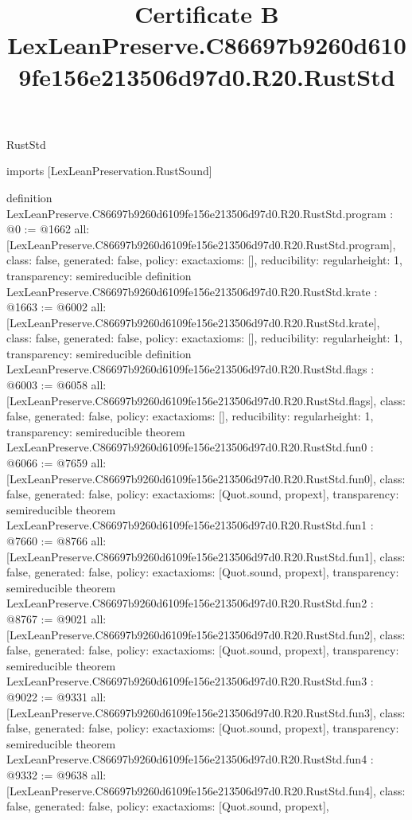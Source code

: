 \begin{lexlean}{RustStd}
\title{Certificate B LexLeanPreserve.C86697b9260d6109fe156e213506d97d0.R20.RustStd}
\begin{coremodule}
imports [LexLeanPreservation.RustSound]

definition LexLeanPreserve.C86697b9260d6109fe156e213506d97d0.R20.RustStd.program : @0 := @1662 {
  all: [LexLeanPreserve.C86697b9260d6109fe156e213506d97d0.R20.RustStd.program],
  class: false,
  generated: false,
  policy: exact{axioms: []},
  reducibility: regular{height: 1},
  transparency: semireducible
}
definition LexLeanPreserve.C86697b9260d6109fe156e213506d97d0.R20.RustStd.krate : @1663 := @6002 {
  all: [LexLeanPreserve.C86697b9260d6109fe156e213506d97d0.R20.RustStd.krate],
  class: false,
  generated: false,
  policy: exact{axioms: []},
  reducibility: regular{height: 1},
  transparency: semireducible
}
definition LexLeanPreserve.C86697b9260d6109fe156e213506d97d0.R20.RustStd.flags : @6003 := @6058 {
  all: [LexLeanPreserve.C86697b9260d6109fe156e213506d97d0.R20.RustStd.flags],
  class: false,
  generated: false,
  policy: exact{axioms: []},
  reducibility: regular{height: 1},
  transparency: semireducible
}
theorem LexLeanPreserve.C86697b9260d6109fe156e213506d97d0.R20.RustStd.fun0 : @6066 := @7659 {
  all: [LexLeanPreserve.C86697b9260d6109fe156e213506d97d0.R20.RustStd.fun0],
  class: false,
  generated: false,
  policy: exact{axioms: [Quot.sound, propext]},
  transparency: semireducible
}
theorem LexLeanPreserve.C86697b9260d6109fe156e213506d97d0.R20.RustStd.fun1 : @7660 := @8766 {
  all: [LexLeanPreserve.C86697b9260d6109fe156e213506d97d0.R20.RustStd.fun1],
  class: false,
  generated: false,
  policy: exact{axioms: [Quot.sound, propext]},
  transparency: semireducible
}
theorem LexLeanPreserve.C86697b9260d6109fe156e213506d97d0.R20.RustStd.fun2 : @8767 := @9021 {
  all: [LexLeanPreserve.C86697b9260d6109fe156e213506d97d0.R20.RustStd.fun2],
  class: false,
  generated: false,
  policy: exact{axioms: [Quot.sound, propext]},
  transparency: semireducible
}
theorem LexLeanPreserve.C86697b9260d6109fe156e213506d97d0.R20.RustStd.fun3 : @9022 := @9331 {
  all: [LexLeanPreserve.C86697b9260d6109fe156e213506d97d0.R20.RustStd.fun3],
  class: false,
  generated: false,
  policy: exact{axioms: [Quot.sound, propext]},
  transparency: semireducible
}
theorem LexLeanPreserve.C86697b9260d6109fe156e213506d97d0.R20.RustStd.fun4 : @9332 := @9638 {
  all: [LexLeanPreserve.C86697b9260d6109fe156e213506d97d0.R20.RustStd.fun4],
  class: false,
  generated: false,
  policy: exact{axioms: [Quot.sound, propext]},
}
\end{coremodule}
\end{lexlean}
